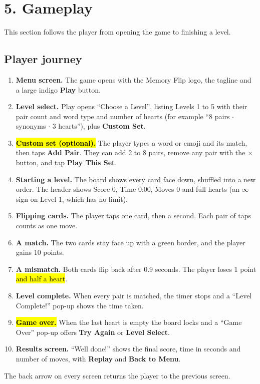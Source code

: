 \documentclass[11pt,a4paper]{article}
\begin{document}
\section{5. Gameplay}
This section follows the player from opening the game to finishing a level.

\subsection*{Player journey}
\begin{enumerate}
  \item \textbf{Menu screen.} The game opens with the Memory Flip logo, the tagline and a large indigo \textbf{Play} button.
  \item \textbf{Level select.} Play opens ``Choose a Level'', listing Levels 1 to 5 with their pair count and word type and number of hearts (for example ``8 pairs $\cdot$ synonyms $\cdot$ 3 hearts''), plus \textbf{Custom Set}.
  \item \textbf{\hl{Custom set (optional).}} The player types a word or emoji and its match, then taps \textbf{Add Pair}. They can add 2 to 8 pairs, remove any pair with the $\times$ button, and tap \textbf{Play This Set}.
  \item \textbf{Starting a level.} The board shows every card face down, shuffled into a new order. The header shows Score 0, Time 0:00, Moves 0 and full hearts (an $\infty$ sign on Level 1, which has no limit).
  \item \textbf{Flipping cards.} The player taps one card, then a second. Each pair of taps counts as one move.
  \item \textbf{A match.} The two cards stay face up with a green border, and the player gains 10 points.
  \item \textbf{A mismatch.} Both cards flip back after 0.9 seconds. The player loses 1 point \hl{and half a heart}.
  \item \textbf{Level complete.} When every pair is matched, the timer stops and a ``Level Complete!'' pop-up shows the time taken.
  \item \textbf{\hl{Game over.}} When the last heart is empty the board locks and a ``Game Over'' pop-up offers \textbf{Try Again} or \textbf{Level Select}.
  \item \textbf{Results screen.} ``Well done!'' shows the final score, time in seconds and number of moves, with \textbf{Replay} and \textbf{Back to Menu}.
\end{enumerate}
The back arrow on every screen returns the player to the previous screen.
\end{document}
